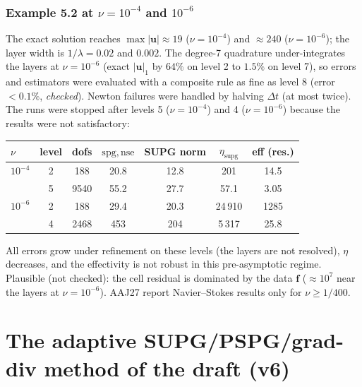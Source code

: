 \documentclass[11pt,a4paper]{article}
\newcommand{\bu}{\boldsymbol{u}}
\newcommand{\bff}{\boldsymbol{f}}
\newcommand{\dt}{\Delta t}
\newcommand{\spg}{\mathrm{spg}}
\begin{document}
\section{Example 5.2 at \texorpdfstring{$\nu=10^{-4}$ and $10^{-6}$}{nu = 1e-4 and 1e-6}}
The exact solution reaches $\max|\bu|\approx19$ ($\nu=10^{-4}$) and $\approx240$ ($\nu=10^{-6}$); the layer width is
$1/\lambda=0.02$ and $0.002$. The degree-7 quadrature under-integrates the layers at $\nu=10^{-6}$ (exact $|\bu|_1$
by $64\%$ on level 2 to $1.5\%$ on level 7), so errors and estimators were evaluated with a composite rule as fine as
level 8 (error $<0.1\%$, \emph{checked}). Newton failures were handled by halving $\dt$ (at most twice). The runs were
stopped after levels 5 ($\nu=10^{-4}$) and 4 ($\nu=10^{-6}$) because the results were not satisfactory:
\begin{center}\small
\begin{tabular}{lcccccc}\toprule
$\nu$ & level & dofs & $\spg,\mathrm{nse}$ & SUPG norm & $\eta_{\mathrm{supg}}$ & eff (res.)\\\midrule
$10^{-4}$ & 2 & 188 & 20.8 & 12.8 & 201 & 14.5\\
 & 5 & 9540 & 55.2 & 27.7 & 57.1 & 3.05\\
$10^{-6}$ & 2 & 188 & 29.4 & 20.3 & 24\,910 & 1285\\
 & 4 & 2468 & 453 & 204 & 5\,317 & 25.8\\\bottomrule
\end{tabular}
\end{center}
All errors grow under refinement on these levels (the layers are not resolved), $\eta$ decreases, and the effectivity
is not robust in this pre-asymptotic regime. Plausible (not checked): the cell residual is dominated by the data
$\bff$ ($\approx10^7$ near the layers at $\nu=10^{-6}$). AAJ27 report Navier--Stokes results only for $\nu\ge1/400$.

\part{The adaptive SUPG/PSPG/grad-div method of the draft (v6)}
\end{document}
